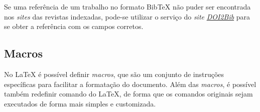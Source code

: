 

\begin{marker}
Se uma referência de um trabalho no formato Bib\TeX{} não puder ser encontrada nos \textit{sites} das revistas indexadas, pode-se utilizar o serviço do \textit{site} \href{https://doi2bib.org}{\textit{DOI2Bib}} para se obter a referência com os campos corretos.
\end{marker}




\subsection{Macros}%
\label{sec:macros}

No \LaTeX{} é possível definir \textit{macros}, que são um conjunto de instruções específicas para facilitar a formatação do documento. Além das \textit{macros}, é possível também redefinir comando do \LaTeX{}, de forma que os comandos originais sejam executados de forma mais simples e customizada.

